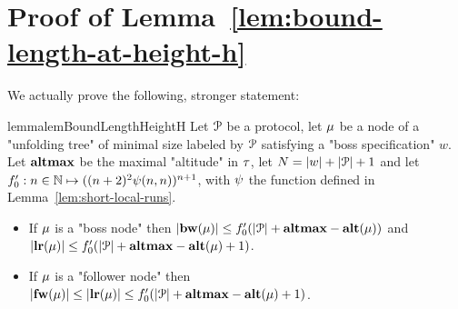 \section{Proof of Lemma~\ref{lem:bound-length-at-height-h}}
\label{app:bound-node-size-with-altitude}

\lemBoundLengthHeightH*

We actually prove the following, stronger statement:
\begin{restatable}{lemma}{lemBoundLengthHeightH}
	\label{lem:bound-length-at-height-h-extended}
	Let $\mathcal{P}$ be a protocol, let $\mu$ be a node of a "unfolding tree" of minimal size labeled by $\mathcal{P}$ satisfying a "boss specification" $w$.
	Let $\mathbf{altmax}$ be the maximal "altitude" in $\tau$, let $N = |w| + |\mathcal{P}| +1$ and let $f_0' : n \in \mathbb{N} \mapsto ((n+2)^2 \psi(n,n))^{n+1}$, with $\psi$ the function defined in Lemma~\ref{lem:short-local-runs}.
	
	\begin{itemize}
		\item If $\mu$ is a "boss node" then $|\mathbf{bw}(\mu)| \leq f_0'(|\mathcal{P}| +\mathbf{altmax} - \mathbf{alt}(\mu))$ and $|\mathbf{lr}(\mu)| \leq f_0'(|\mathcal{P}| +\mathbf{altmax} - \mathbf{alt}(\mu)+1)$.
		
		\item If $\mu$ is a "follower node" then $|\mathbf{fw}(\mu)| \leq |\mathbf{lr}(\mu)| \leq f_0'(|\mathcal{P}| + \mathbf{altmax} - \mathbf{alt}(\mu)+1)$.
	\end{itemize} 
\end{restatable}
